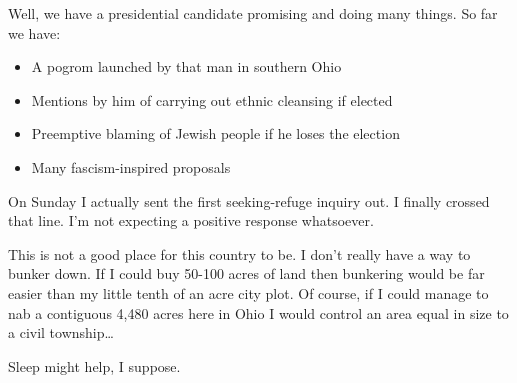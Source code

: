Well, we have a presidential candidate promising and doing many things.
So far we have:

\begin{itemize}
\item
  A pogrom launched by that man in southern Ohio
\item
  Mentions by him of carrying out ethnic cleansing if elected
\item
  Preemptive blaming of Jewish people if he loses the election
\item
  Many fascism-inspired proposals
\end{itemize}

On Sunday I actually sent the first seeking-refuge inquiry out. I
finally crossed that line. I'm not expecting a positive response
whatsoever.

This is not a good place for this country to be. I don't really have a
way to bunker down. If I could buy 50-100 acres of land then bunkering
would be far easier than my little tenth of an acre city plot. Of
course, if I could manage to nab a contiguous 4,480 acres here in Ohio I
would control an area equal in size to a civil township\ldots{}

Sleep might help, I suppose.
